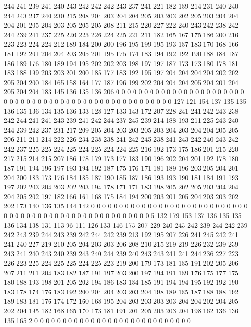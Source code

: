 244 241 239 241 240 243 242 242 242 243 237 241 221 182 189 214 231 240 240 244
243 237 240 230 215 208 204 203 204 204 205 203 203 202 205 203 204 204 204 201
205 204 203 205 205 205 208 211 215 220 227 222 240 243 242 238 242 244 239 241
237 225 226 223 226 224 225 221 211 182 165 167 175 186 200 216 223 223 224 224
212 189 184 200 200 196 195 199 195 193 187 183 170 168 166 181 192 201 204 204
203 205 201 195 175 174 183 194 192 192 190 188 184 187 186 189 176 180 189 194
195 202 202 203 198 197 197 187 173 173 180 178 181 183 188 199 203 203 201 200
185 177 183 192 195 197 204 204 204 204 202 202 205 204 200 184 165 158 164 177
187 196 199 202 204 204 204 205 204 201 204 205 204 204 183 145 136 135 136 206
0 0 0 0 0 0 0 0 0 0 0 0 0 0 0 0 0 0 0 0
0 0 0 0 0 0 0 0 0 0 0 0 0 0 0 0 0 0 0 0
0 0 0 0 0 0 0 0 0 0 0 0 0 127 121 154 137 135 135 136
135 136 134 135 136 133 128 127 133 143 172 207 228 241 241 242 243 238 242 244
241 241 243 239 241 242 244 237 245 239 214 188 193 211 225 243 240 244 239 242
237 231 217 209 205 204 203 203 205 203 204 203 204 204 205 205 206 211 211 214
222 226 234 238 238 241 242 245 238 241 243 242 240 243 242 242 237 225 225 224
225 224 225 224 224 225 216 192 173 175 186 201 215 220 217 215 214 215 207 186
178 179 173 177 183 190 196 202 204 201 192 178 180 187 191 194 196 197 193 194
192 187 175 176 171 181 189 196 203 205 204 201 204 200 183 173 176 184 185 187
190 185 187 186 193 193 190 181 184 191 193 197 202 203 204 203 202 203 194 178
171 171 183 198 205 202 205 203 204 204 204 205 202 197 182 166 161 168 175 184
194 200 203 201 205 204 203 203 202 202 173 140 136 135 144 142 0 0 0 0
0 0 0 0 0 0 0 0 0 0 0 0 0 0 0 0 0 0 0 0
0 0 0 0 0 0 0 0 0 0 0 0 0 0 0 0 0 0 0 0
0 0 0 0 0 0 0 0 0 0 5 132 179 153 137 136 135 135 136 134
138 131 113 96 111 126 133 146 173 207 229 240 243 242 239 244 242 239 242 243
239 244 243 239 242 244 242 239 213 192 195 207 226 241 245 242 241 241 240 227
219 210 205 204 203 203 206 208 210 215 219 219 226 232 239 239 243 241 240 243
240 239 243 240 244 239 240 243 243 241 241 244 236 227 223 226 223 225 224 225
225 224 225 223 219 200 179 173 181 185 191 202 205 206 207 211 211 204 183 182
187 191 197 203 200 197 194 191 189 176 175 177 175 180 188 193 198 201 205 202
194 186 183 184 185 191 194 194 195 192 192 190 183 178 174 176 183 192 200 204
204 203 203 204 198 189 185 187 188 188 192 189 183 181 176 174 172 160 168 195
204 203 203 203 203 204 204 202 204 205 202 204 195 182 168 165 170 173 181 191
201 205 203 203 204 198 162 136 136 135 165 2 0 0 0 0 0 0 0 0
0 0 0 0 0 0 0 0 0 0 0 0 0 0 0 0 0 0 0 0
